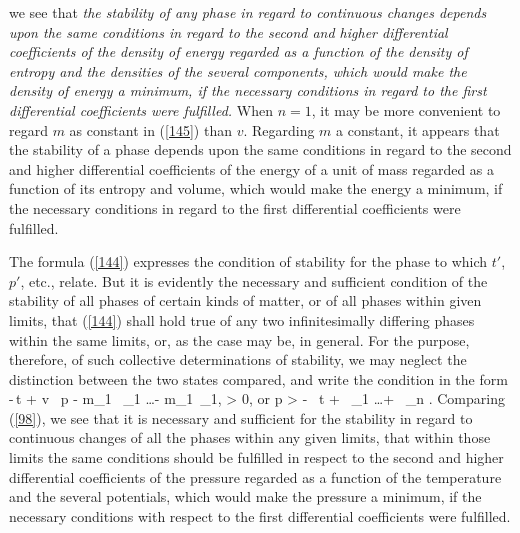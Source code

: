 \documentclass[12pt]{article}
\begin{document}
we see that \textit{the stability of any phase in regard to continuous changes depends upon the same conditions in regard to the second and higher differential coefficients of the density of energy regarded as a function of the density of entropy and the densities of the several components, which would make the density of energy a minimum, if the necessary conditions in regard to the first differential coefficients were fulfilled.} When $n =1$, it may be more convenient to regard $m$ as constant in (\ref{145}) than $v$. Regarding $m$ a constant, it appears that the stability of a phase depends upon the same conditions in regard to the second and higher differential coefficients of the energy of a unit of mass regarded as a function of its entropy and volume, which would make the energy a minimum, if the necessary conditions in regard to the first differential coefficients were fulfilled.


The formula (\ref{144}) expresses the condition of stability for the phase to which $t'$, $p'$, etc., relate.  But it is evidently the necessary and sufficient condition of the stability of all phases of certain kinds of matter, or of all phases within given limits, that (\ref{144}) shall hold true of any two infinitesimally differing phases within the same limits, or, as the case may be, in general.  For the purpose, therefore, of such collective determinations of stability, we may neglect the distinction between the two states compared, and write the condition in the form
\eqs  -\eta \,\Delta t + v \, \Delta p - m_1 \, \Delta \mu_1 \dots - m_1 \,\Delta \mu_1, > 0, \label{148}\eqe
or
\eqs 
\Delta p > - \, \Delta t +  \, \Delta \mu_1  \dots +  \, \Delta \mu_n .\label{149}
\eqe
Comparing (\ref{98}), we see that it is necessary and sufficient for the stability in regard to continuous changes of all the phases within any given limits, that within those limits the same conditions should be fulfilled in respect to the second and higher differential coefficients of the pressure regarded as a function of the temperature and the several potentials, which would make the pressure a minimum, if the necessary conditions with respect to the first differential coefficients were fulfilled.
\end{document}
